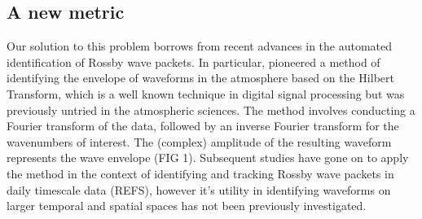\subsection{A new metric}

Our solution to this problem borrows from recent advances in the automated identification of Rossby wave packets. In particular, \citet{Zimin2003} pioneered a method of identifying the envelope of waveforms in the atmosphere based on the Hilbert Transform, which is a well known technique in digital signal processing but was previously untried in the atmospheric sciences. The method involves conducting a Fourier transform of the data, followed by an inverse Fourier transform for the wavenumbers of interest. The (complex) amplitude of the resulting waveform represents the wave envelope (FIG 1). Subsequent studies have gone on to apply the method in the context of identifying and tracking Rossby wave packets in daily timescale data (REFS), however it's utility in identifying waveforms on larger temporal and spatial spaces has not been previously investigated.   